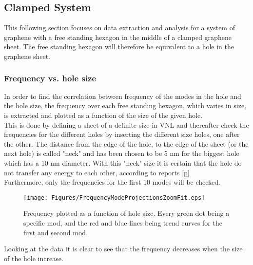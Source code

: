 \subsection{Clamped System}
This following section focuses on data extraction and analysis for a system of graphene with a free standing hexagon in the middle of a clamped graphene sheet. The free standing hexagon will therefore be equivalent to a hole in the graphene sheet.  
\subsubsection{Frequency vs. hole size}
In order to find the correlation between frequency of the modes in the hole and the hole size, the frequency over each free standing hexagon, which varies in size, is extracted and plotted as a function of the size of the given hole. \\
This is done by defining a sheet of a definite size in VNL and thereafter check the frequencies for the different holes by inserting the different size holes, one after the other. The distance from the edge of the hole, to the edge of the sheet (or the next hole) is called "neck" and has been chosen to be 5 nm for the biggest hole which has a 10 nm diameter. With this "neck" size it is certain that the hole do not transfer any energy to each other, according to reports \ref{p} \\
Furthermore, only the frequencies for the first 10 modes will be checked.
\onecolumngrid

\begin{figure}
    \centering
    \texttt{[image: Figures/FrequencyModeProjectionsZoomFit.eps]}
    \caption{Frequency plotted as a function of hole size. Every green dot being a specific mod, and the red and blue lines being trend curves for the first and second mod.}
    \label{size vs frequency}
\end{figure}
\twocolumngrid
Looking at the data it is clear to see that the frequency decreases when the size of the hole increase.